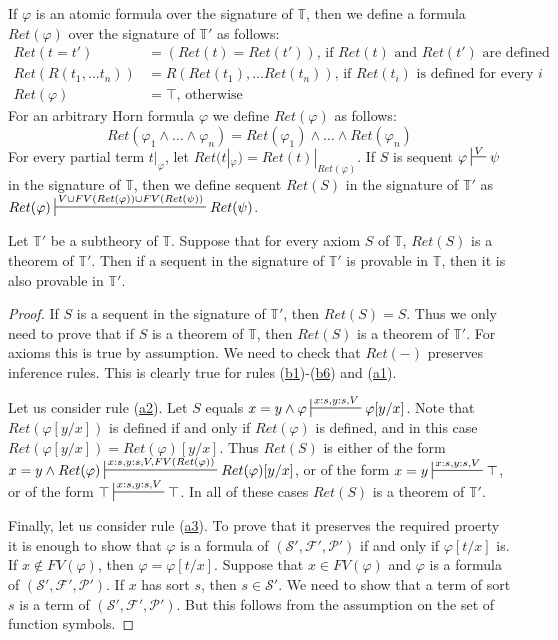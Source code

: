\documentclass[reqno]{amsart}
\newcommand{\axref}[1]{(\hyperref[ax:#1]{#1})}
\theoremstyle{definition}
\theoremstyle{remark}
\numberwithin{figure}{section}
\begin{document}
If $\varphi$ is an atomic formula over the signature of $\mathbb{T}$, then we define a formula $Ret(\varphi)$ over the signature of $\mathbb{T}'$ as follows:
\begin{align*}
Ret(t = t') & = (Ret(t) = Ret(t')) \text{, if $Ret(t)$ and $Ret(t')$ are defined} \\
Ret(R(t_1, \ldots t_n)) & = R(Ret(t_1), \ldots Ret(t_n)) \text{, if $Ret(t_i)$ is defined for every $i$} \\
Ret(\varphi) & = \top \text{, otherwise}
\end{align*}
For an arbitrary Horn formula $\varphi$ we define $Ret(\varphi)$ as follows:
\[ Ret(\varphi_1 \land \ldots \land \varphi_n) = Ret(\varphi_1) \land \ldots \land Ret(\varphi_n) \]
For every partial term $t|_\varphi$, let $Ret(t|_\varphi) = Ret(t)|_{Ret(\varphi)}$.
If $S$ is sequent $\varphi \sststile{}{V} \psi$ in the signature of $\mathbb{T}$,
    then we define sequent $Ret(S)$ in the signature of $\mathbb{T}'$ as $Ret(\varphi) \sststile{}{V \cup FV(Ret(\varphi)) \cup FV(Ret(\psi))} Ret(\psi)$.

\begin{lem}[subtheory]
Let $\mathbb{T}'$ be a subtheory of $\mathbb{T}$.
Suppose that for every axiom $S$ of $\mathbb{T}$, $Ret(S)$ is a theorem of $\mathbb{T}'$.
Then if a sequent in the signature of $\mathbb{T}'$ is provable in $\mathbb{T}$, then it is also provable in $\mathbb{T}'$.
\end{lem}
\begin{proof}
If $S$ is a sequent in the signature of $\mathbb{T}'$, then $Ret(S) = S$.
Thus we only need to prove that if $S$ is a theorem of $\mathbb{T}$, then $Ret(S)$ is a theorem of $\mathbb{T}'$.
For axioms this is true by assumption.
We need to check that $Ret(-)$ preserves inference rules.
This is clearly true for rules \axref{b1}-\axref{b6} and \axref{a1}.

Let us consider rule \axref{a2}.
Let $S$ equals $x = y \land \varphi \sststile{}{x:s,y:s,V} \varphi[y/x]$.
Note that $Ret(\varphi[y/x])$ is defined if and only if $Ret(\varphi)$ is defined, and in this case $Ret(\varphi[y/x]) = Ret(\varphi)[y/x]$.
Thus $Ret(S)$ is either of the form $x = y \land Ret(\varphi) \sststile{}{x:s,y:s,V,FV(Ret(\varphi))} Ret(\varphi)[y/x]$,
or of the form $x = y \sststile{}{x:s,y:s,V} \top$, or of the form $\top \sststile{}{x:s,y:s,V} \top$.
In all of these cases $Ret(S)$ is a theorem of $\mathbb{T}'$.

Finally, let us consider rule \axref{a3}.
To prove that it preserves the required proerty it is enough to show that $\varphi$ is a formula of $(\mathcal{S}',\mathcal{F}',\mathcal{P}')$ if and only if $\varphi[t/x]$ is.
If $x \notin FV(\varphi)$, then $\varphi = \varphi[t/x]$.
Suppose that $x \in FV(\varphi)$ and $\varphi$ is a formula of $(\mathcal{S}',\mathcal{F}',\mathcal{P}')$.
If $x$ has sort $s$, then $s \in \mathcal{S}'$.
We need to show that a term of sort $s$ is a term of $(\mathcal{S}',\mathcal{F}',\mathcal{P}')$.
But this follows from the assumption on the set of function symbols.
\end{proof}
\end{document}
